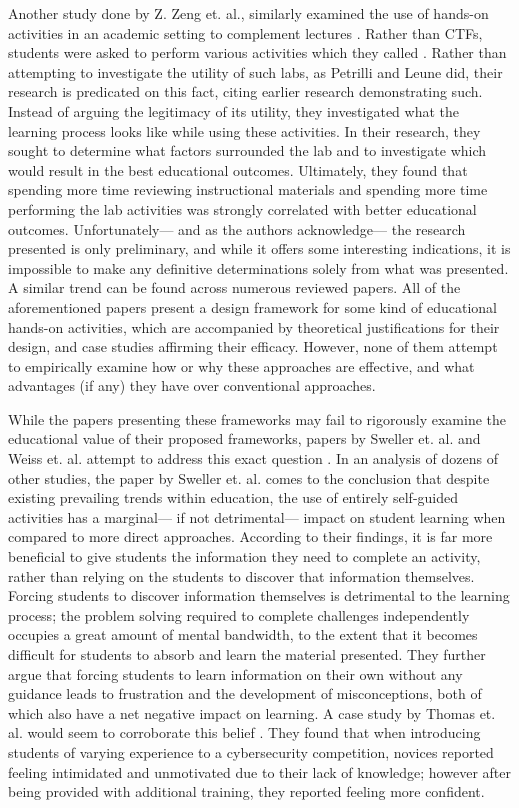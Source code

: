     Another study done by Z. Zeng et. al., similarly examined the use of hands-on activities in an academic setting to complement lectures \cite{Z-Zeng}. %
Rather than CTFs, students were asked to perform various activities which they called . %
Rather than attempting to investigate the utility of such labs, as Petrilli and Leune did, their research is predicated on this fact, citing earlier research demonstrating such. %
Instead of arguing the legitimacy of its utility, they investigated what the learning process looks like while using these activities. %
In their research, they sought to determine what factors surrounded the lab and to investigate which would result in the best educational outcomes. 
    Ultimately, they found that spending more time reviewing instructional materials and spending more time performing the lab activities was strongly correlated with better educational outcomes. %
Unfortunately---%
and as the authors acknowledge---%
the research presented is only preliminary, and while it offers some interesting indications, it is impossible to make any definitive determinations solely from what was presented. %
A similar trend can be found across numerous reviewed papers\cite{Y-Deng,W-Du,N-Eliot}. %
All of the aforementioned papers present a design framework for some kind of educational hands-on activities, which are accompanied by theoretical justifications for their design, and case studies affirming their efficacy. %
However, none of them attempt to empirically examine how or why these approaches are effective, and what advantages (if any) they have over conventional approaches. 

    While the papers presenting these frameworks may fail to rigorously examine the educational value of their proposed frameworks, papers by Sweller et. al. and Weiss et. al. attempt to address this exact question \cite{J-Sweller,R-Weiss}. %
In an analysis of dozens of other studies, the paper by Sweller et. al. comes to the conclusion that despite existing prevailing trends within education, the use of entirely self-guided activities has a marginal---%
if not detrimental---%
impact on student learning when compared to more direct approaches. %
According to their findings, it is far more beneficial to give students the information they need to complete an activity, rather than relying on the students to discover that information themselves. %
Forcing students to discover information themselves is detrimental to the learning process; %
the problem solving required to complete challenges independently occupies a great amount of mental bandwidth, to the extent that it becomes difficult for students to absorb and learn the material presented. %
They further argue that forcing students to learn information on their own without any guidance leads to frustration and the development of misconceptions, both of which also have a net negative impact on learning. %
A case study by Thomas et. al. would seem to corroborate this belief \cite{L-Thomas}. %
They found that when introducing students of varying experience to a cybersecurity competition, novices reported feeling intimidated and unmotivated due to their lack of knowledge; %
however after being provided with additional training, they reported feeling more confident. 

